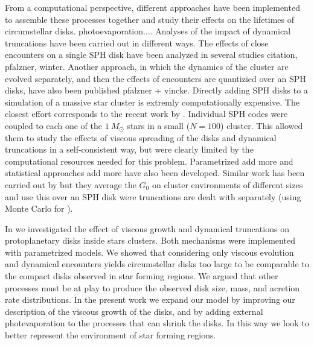 \documentclass[fleqn,usenatbib]{mnras}
\newcommand\note[1]{{\colorbox{yellow!60}{\color{magenta}#1}}}
\begin{document}
From a computational perspective, different approaches have been implemented to assemble these processes together and study their effects on the lifetimes of circumstellar disks. \note{photoevaporation...}. Analyses of the impact of dynamical truncations have been carried out in different ways. The effects of close encounters on a single SPH disk have been analyzed in several studies \note{citation, pfalzner, winter}. Another approach, in which the dynamics of the cluster are evolved separately, and then the effects of encounters are quantizied over an SPH disks, have also been published \note{pfalzner + vincke}. Directly adding SPH disks to a simulation of a massive star cluster is extremly computationally expensive. The closest effort corresponds to the recent work by \citet{rosotti2014}. Individual SPH codes were coupled to each one of the $\SI{1}{M_\odot}$ stars in a small ($N=100$) cluster. This allowed them to study the effects of viscous spreading of the disks and dynamical truncations in a self-consistent way, but were clearly limited by the computational resources needed for this problem. Parametrized \citep[e.g.][]{concha-ramirez2019,portegieszwart2016}\note{add more} and statistical approaches \citep[e.g.][]{olczak2006,malmberg2011}\note{add more} have also been developed. 
Similar work has been carried out by \citet{adams2006,winter2018a} but they average the $G_0$ on cluster environments of different sizes and use this over an SPH disk were truncations are dealt with separately (using Monte Carlo for \citet{winter2018a}).

In \citet{concha-ramirez2019} we investigated the effect of viscous growth and dynamical truncations on protoplanetary disks inside stars clusters. Both mechanisms were implemented with parametrized models. We showed that considering only viscous evolution and dynamical encounters yields circumstellar disks too large to be comparable to the compact disks observed in star forming regions. We argued that other processes must be at play to produce the observed disk size, mass, and acretion rate distributions. In the present work we expand our model by improving our description of the viscous growth of the disks, and by adding external photevaporation to the processes that can shrink the disks. In this way we look to better represent the environment of star forming regions. 
\end{document}
